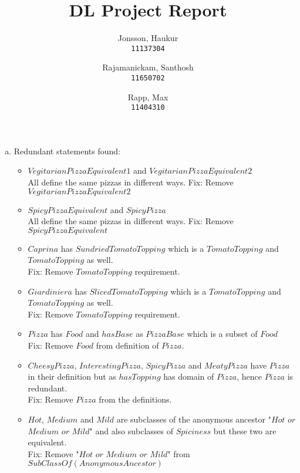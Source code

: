 \documentclass{article}
\begin{document}
\author{
  Jonsson, Haukur\\
  \texttt{11137304}
  \and
  Rajamanickam, Santhosh\\
  \texttt{11650702}
  \and
  Rapp, Max\\
  \texttt{11404310}
}
\title{DL Project Report}
\maketitle

\begin{enumerate}[(a)]
\item Redundant statements found:

\begin{itemize}
\item $VegitarianPizzaEquivalent1$ and $VegitarianPizzaEquivalent2$ \\
All define the same pizzas in different ways.
Fix: Remove $VegitarianPizzaEquivalent2$

\item $SpicyPizzaEquivalent$ and $SpicyPizza$ \\
All define the same pizzas in different ways.
Fix: Remove $SpicyPizzaEquivalent$

\item $Caprina$ has $SundriedTomatoTopping$ which is a $TomatoTopping$ and $TomatoTopping$ as well. \\
Fix: Remove $TomatoTopping$ requirement.

\item $Giardiniera$ has $SlicedTomatoTopping$ which is a $TomatoTopping$ and $TomatoTopping$ as well. \\
Fix: Remove $TomatoTopping$ requirement.

\item $Pizza$ has $Food$ and $hasBase$ as $PizzaBase$ which is a subset of $Food$ \\
Fix: Remove $Food$ from definition of $Pizza$.

\item $CheesyPizza$, $InterestingPizza$, $SpicyPizza$ and $Meaty Pizza$ have $Pizza$ in their definition but as $hasTopping$ has domain of $Pizza$, hence $Pizza$ is redundant. \\ 
Fix: Remove $Pizza$ from the definitions.

\item  $Hot$, $Medium$ and $Mild$ are subclasses of the anonymous ancestor "$Hot$ $or$ $Medium$ $or$ $Mild$" and also subclasses of $Spiciness$ but these two are equivalent. \\
Fix: Remove "$Hot$ $or$ $Medium$ $or$ $Mild$" from $SubClass Of(Anonymous Ancestor)$ 


\end{itemize}
\end{enumerate}
\end{document}
